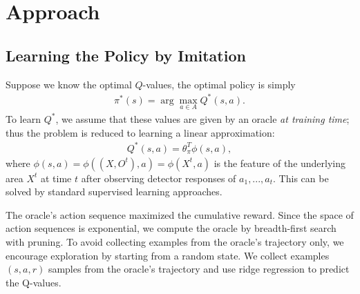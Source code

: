 \section{Approach}
\subsection{Learning the Policy by Imitation}
Suppose we know the optimal $Q$-values, the optimal policy is simply
\begin{eqnarray}
\label{eq:pi}
\pi^\ast(s) = \arg\max_{a\in A} Q^\ast(s,a).
\end{eqnarray}
To learn $Q^\ast$, we assume that these values are given by an oracle \emph{at training time}; thus the problem is reduced to learning
a linear approximation:
\begin{eqnarray}
\label{eq:qvalue}
Q^{\ast}(s,a) = \theta_\pi^T \phi(s,a),
\end{eqnarray}
where $\phi(s,a) = \phi((X, O^t),a) = \phi(X^t,a)$ is the feature of the underlying area $X^t$ at time $t$ after observing detector responses of $a_1,...,a_t$. 
This can be solved by standard supervised learning approaches.

The oracle's action sequence maximized the cumulative reward. Since the space of action sequences is exponential, we compute the oracle by breadth-first search with pruning. To avoid collecting examples from the oracle's trajectory only, we encourage exploration by starting from a random state.
We collect examples $(s,a,r)$ samples from the oracle's trajectory and use ridge regression to predict the Q-values.

%


